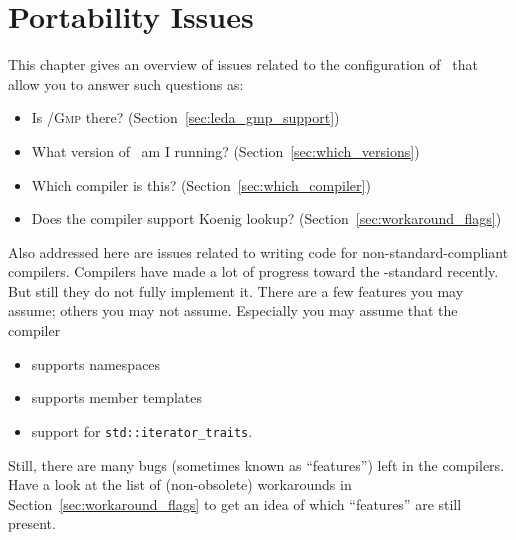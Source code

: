 
\chapter{Portability Issues}
\label{chap:portability}

This chapter gives an overview of issues related to the
configuration of \cgal\ that allow you to answer such questions as:
\begin{itemize}
\item Is \leda/\textsc{Gmp} there? (Section~\ref{sec:leda_gmp_support})
\item What version of \cgal\ am I running? (Section~\ref{sec:which_versions})
\item Which compiler is this? (Section~\ref{sec:which_compiler})
\item Does the compiler support Koenig lookup? (Section~\ref{sec:workaround_flags})
\end{itemize}

Also addressed here are issues related to writing code for 
non-standard-compliant compilers.  Compilers have made a lot of progress toward 
the \CC-standard recently.  But still they do not fully implement it. There 
are a few features you may assume; others you may not
assume. Especially you may assume that the compiler
\begin{itemize}
\item supports namespaces
\item supports member templates
\item support for \texttt{std::iterator\_traits}.
\end{itemize}
Still, there are many bugs (sometimes known as ``features'') left in the 
compilers.  Have a look at the list of (non-obsolete) workarounds in 
Section~\ref{sec:workaround_flags} to get an idea of which ``features'' are
still present.  

